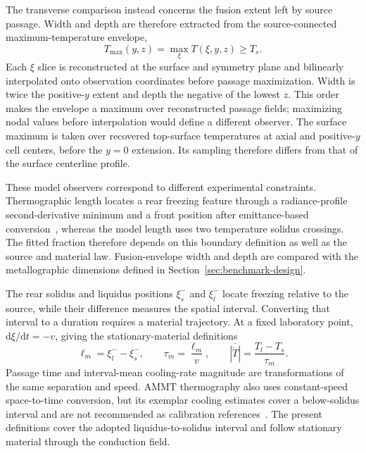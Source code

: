 \documentclass[preprint,12pt]{elsarticle}
\begin{document}
The transverse comparison instead concerns the fusion extent left by source passage. Width and depth are therefore extracted from the source-connected maximum-temperature envelope,
\begin{equation}
 T_{\max}(y,z)=\max_\xi T(\xi,y,z)\geq T_s.
 \label{eq:fusion}
\end{equation}
Each $\xi$ slice is reconstructed at the surface and symmetry plane and bilinearly interpolated onto observation coordinates before passage maximization. Width is twice the positive-$y$ extent and depth the negative of the lowest $z$. This order makes the envelope a maximum over reconstructed passage fields; maximizing nodal values before interpolation would define a different observer. The surface maximum is taken over recovered top-surface temperatures at axial and positive-$y$ cell centers, before the $y=0$ extension. Its sampling therefore differs from that of the surface centerline profile.

These model observers correspond to different experimental constraints. Thermographic length locates a rear freezing feature through a radiance-profile second-derivative minimum and a front position after emittance-based conversion~\cite{lane2020}, whereas the model length uses two temperature solidus crossings. The fitted fraction therefore depends on this boundary definition as well as the source and material law. Fusion-envelope width and depth are compared with the metallographic dimensions defined in Section~\ref{sec:benchmark-design}.

The rear solidus and liquidus positions $\xi_s^-$ and $\xi_l^-$ locate freezing relative to the source, while their difference measures the spatial interval. Converting that interval to a duration requires a material trajectory. At a fixed laboratory point, $\mathrm d\xi/\mathrm dt=-v$, giving the stationary-material definitions
\begin{equation}
 \ell_m=\xi_l^- -\xi_s^-,\qquad
 \tau_m=\frac{\ell_m}{v},\qquad
 \overline{|\dot T|}=\frac{T_l-T_s}{\tau_m}.
 \label{eq:passage}
\end{equation}
Passage time and interval-mean cooling-rate magnitude are transformations of the same separation and speed. AMMT thermography also uses constant-speed space-to-time conversion, but its exemplar cooling estimates cover a below-solidus interval and are not recommended as calibration references~\cite{lane2020}. The present definitions cover the adopted liquidus-to-solidus interval and follow stationary material through the conduction field.
\end{document}
